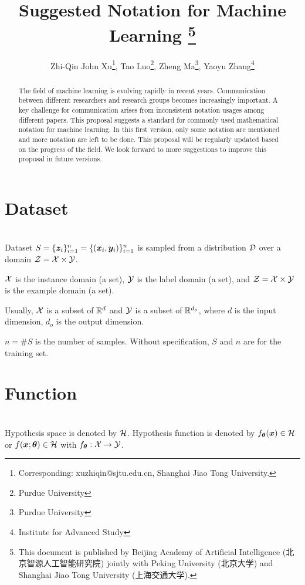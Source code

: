 \documentclass{article}
\begin{document}
\title{Suggested Notation for Machine Learning \thanks{This document is published by Beijing Academy of Artificial Intelligence (北京智源人工智能研究院) jointly with Peking University (北京大学) and Shanghai Jiao Tong University (上海交通大学).}}
\author{Zhi-Qin John Xu\thanks{Corresponding: xuzhiqin@sjtu.edu.cn, Shanghai Jiao Tong University.}, Tao Luo\thanks{Purdue University}, Zheng Ma\thanks{Purdue University}, Yaoyu Zhang\thanks{Institute for Advanced Study}}

\maketitle 
\begin{abstract}
The field of machine learning is evolving rapidly in recent years. Communication between different researchers and research groups becomes increasingly important. A key challenge for communication arises from inconsistent notation usages among different papers. This proposal suggests a standard for commonly used mathematical notation for machine learning. In this first version, only some notation are mentioned and more notation are left to be done. This proposal will be regularly updated based on the progress of the field. We look forward to more suggestions to improve this proposal in future versions.
\end{abstract}

\tableofcontents

\section{Dataset}~\\
Dataset  $S=\{\bm{z}_i\}_{i=1}^n=\{(\bm{x}_i,\bm{y}_i)\}_{i=1}^n$ is sampled from a distribution $\mathcal{D}$ over a domain $\mathcal{Z}=\mathcal{X}\times\mathcal{Y}$. 

$\mathcal{X}$  is the instance domain (a set), $\mathcal{Y}$ is the label domain (a set), and $\mathcal{Z}=\mathcal{X}\times\mathcal{Y}$ is the example domain (a set). 

Usually, 
$\mathcal{X}$ is a subset of $\mathbb{R}^d$ and $\mathcal{Y}$ is a subset of $\mathbb{R}^{d_{o}}$, where $d$ is the input dimension, $d_{o}$ is the output dimension.

$n=\#S$ is the number of samples. Without specification, $S$ and $n$ are for the training set.

\section{Function}~\\
Hypothesis space is denoted by $\mathcal{H}$. Hypothesis function is denoted by $f_{\bm{\theta}}(\bm{x})\in\mathcal{H}$ or $f(\bm{x};\bm{\theta})\in\mathcal{H}$ with $f_{\bm{\theta}}:\mathcal{X}\to\mathcal{Y}$.
\end{document}
